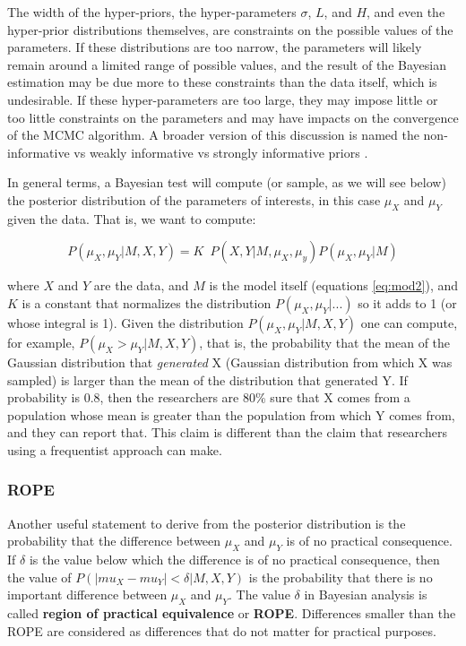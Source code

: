 \documentclass[twoside,11pt,preprint]{article}
\begin{document}
The width of the hyper-priors, the hyper-parameters \(\sigma\), \(L\),
and \(H\), and even the hyper-prior distributions themselves, are
constraints on the possible values of the parameters. If these
distributions are too narrow, the parameters will likely remain around
a limited range of possible values, and the result of the Bayesian
estimation may be due more to these constraints than the data itself,
which is undesirable. If these hyper-parameters are too large, they may
impose little or too little constraints on the parameters and may have
impacts on the convergence of the MCMC algorithm. A broader version of this
discussion is named the non-informative vs weakly informative vs
strongly informative priors \citep{lemoine2019moving, gelman2017prior}.

In general terms, a Bayesian test will compute (or sample, as we will
see below) the posterior distribution of the parameters of interests,
in this case \(\mu_X\) and \(\mu_Y\) given the data. That is, we want to
compute:

\[ P(\mu_X,\mu_Y | M, X, Y) = K \; \:  P(X,Y| M, \mu_X, \mu_y) P(\mu_X, \mu_Y | M)\]

where \(X\) and \(Y\) are the data, and \(M\) is the model itself
(equations \ref{eq:mod2}), and \(K\) is a constant that normalizes the
distribution \(P(\mu_X,\mu_Y| ...)\) so it adds to 1 (or whose integral
is 1). Given the distribution \(P(\mu_X,\mu_Y | M, X, Y)\) one can
compute, for example, \(P( \mu_X > \mu_Y | M, X, Y)\), that is, the
probability that the mean of the Gaussian distribution that
\emph{generated} X (Gaussian distribution from which X was sampled) is
larger than the mean of the distribution that generated Y. If
probability is 0.8, then the researchers are 80\% sure that X comes
from a population whose mean is greater than the population from which Y
comes from, and they can report that. This claim is different than the
claim that researchers using a frequentist approach can make.

\hypertarget{rope}{%
\subsubsection{ROPE}\label{rope}}

Another useful statement to derive from the posterior distribution is
the probability that the difference between \(\mu_X\) and \(\mu_Y\) is of
no practical consequence. If \(\delta\) is the value below which the
difference is of no practical consequence, then the value of
\(P(|mu_X - mu_Y| < \delta | M, X, Y)\) is the probability that there is
no important difference between \(\mu_X\) and \(\mu_Y\). The value
\(\delta\) in Bayesian analysis is called \textbf{region of practical
equivalence} or \textbf{ROPE}. Differences smaller than the ROPE are
considered as differences that do not matter for practical purposes.
\end{document}
